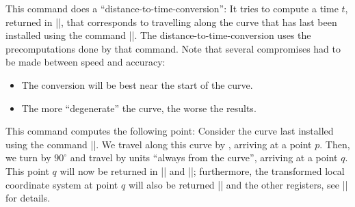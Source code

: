 \begin{command}{\pgfcurvilineardistancetotime{}}
    This command does a ``distance-to-time-conversion'': It tries to compute a
    time $t$, returned in |\pgf@x|, that corresponds to travelling
     along the curve that has last been installed using the
    command |\pgfsetcurvilinearbeziercurve|. The distance-to-time-conversion
    uses the precomputations done by that command. Note that several
    compromises had to be made between speed and accuracy:
    \begin{itemize}
        \item The conversion will be best near the start of the curve.
        \item The more ``degenerate'' the curve, the worse the results.
    \end{itemize}
\end{command}

\begin{command}{\pgfpointcurvilinearbezierorthogonal{}}
    This command computes the following point: Consider the curve last
    installed using the command |\pgfsetcurvilinearbeziercurve|. We travel
    along this curve by , arriving at a point $p$. Then, we turn
    by $90^\circ$ and travel by  units ``always from the curve'',
    arriving at a point $q$. This point $q$ will now be returned in |\pgf@x|
    and |\pgf@y|; furthermore, the transformed local coordinate system at point
    $q$ will also be returned |\pgf@xa| and the other registers, see
    |\pgftransformnonlinear| for details.
\makeatletter
\begin{codeexample}[]
\end{codeexample}

\begin{codeexample}[]
\end{codeexample}
\end{command}

